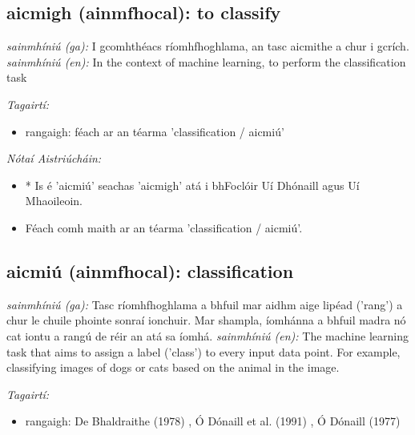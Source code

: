 \documentclass{article}
\begin{document}
\subsection*{aicmigh (ainmfhocal): to classify} 
 \noindent \textit{sainmhíniú (ga):} I gcomhthéacs ríomhfhoghlama, an tasc aicmithe a chur i gcrích.
\newline\newline
 \noindent \textit{sainmhíniú (en):} In the context of machine learning, to perform the classification task
\newline

 \noindent \textit{Tagairtí:}
\begin{itemize}
	\item rangaigh: féach ar an téarma 'classification / aicmiú'
\end{itemize}

 \noindent \textit{Nótaí Aistriúcháin:}
\begin{itemize}
	\item * Is é 'aicmiú' seachas 'aicmigh' atá i bhFoclóir Uí Dhónaill agus Uí Mhaoileoin.
	\item Féach comh maith ar an téarma 'classification / aicmiú'.
\end{itemize}


\subsection*{aicmiú (ainmfhocal): classification} 
 \noindent \textit{sainmhíniú (ga):} Tasc ríomhfhoghlama a bhfuil mar aidhm aige lipéad ('rang') a chur le chuile phointe sonraí ionchuir. Mar shampla, íomhánna a bhfuil madra nó cat iontu a rangú de réir an  atá sa íomhá.
\newline\newline
 \noindent \textit{sainmhíniú (en):} The machine learning task that aims to assign a label ('class') to every input data point. For example, classifying images of dogs or cats based on the animal in the image.
\newline

 \noindent \textit{Tagairtí:}
\begin{itemize}
	\item rangaigh: De Bhaldraithe (1978) \cite{de-bhaldraithe}, Ó Dónaill et al. (1991) \cite{focloir-beag}, Ó Dónaill (1977) \cite{odonaill}
\end{itemize}
\end{document}
